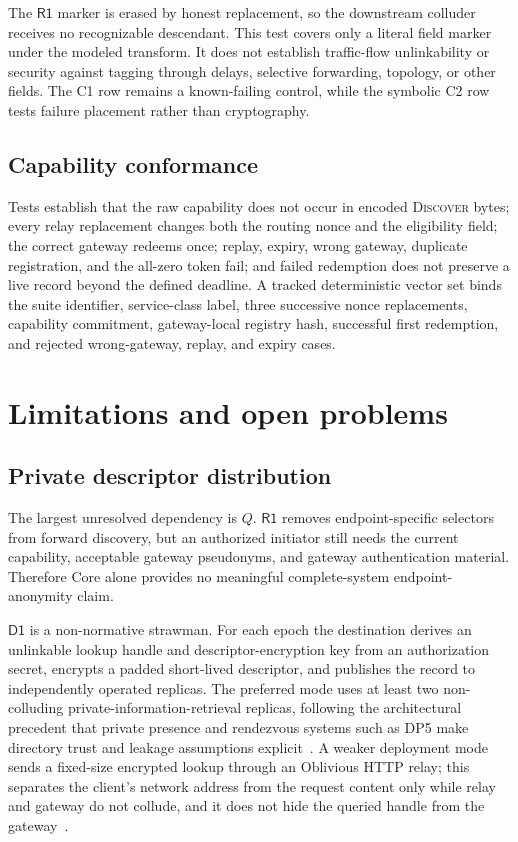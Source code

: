 \documentclass[11pt,oneside]{article}
\newcommand{\Rone}{\ensuremath{\mathsf{R1}}}
\newcommand{\Done}{\ensuremath{\mathsf{D1}}}
\begin{document}
The \Rone{} marker is erased by honest replacement, so the downstream colluder receives no recognizable descendant. This test covers only a literal field marker under the modeled transform. It does not establish traffic-flow unlinkability or security against tagging through delays, selective forwarding, topology, or other fields. The C1 row remains a known-failing control, while the symbolic C2 row tests failure placement rather than cryptography.

\subsection{Capability conformance}

Tests establish that the raw capability does not occur in encoded \textsc{Discover} bytes; every relay replacement changes both the routing nonce and the eligibility field; the correct gateway redeems once; replay, expiry, wrong gateway, duplicate registration, and the all-zero token fail; and failed redemption does not preserve a live record beyond the defined deadline. A tracked deterministic vector set binds the suite identifier, service-class label, three successive nonce replacements, capability commitment, gateway-local registry hash, successful first redemption, and rejected wrong-gateway, replay, and expiry cases.

\section{Limitations and open problems}
\label{sec:limitations}

\subsection{Private descriptor distribution}

The largest unresolved dependency is $Q$. \Rone{} removes endpoint-specific selectors from forward discovery, but an authorized initiator still needs the current capability, acceptable gateway pseudonyms, and gateway authentication material. Therefore Core alone provides no meaningful complete-system endpoint-anonymity claim.

\Done{} is a non-normative strawman. For each epoch the destination derives an unlinkable lookup handle and descriptor-encryption key from an authorization secret, encrypts a padded short-lived descriptor, and publishes the record to independently operated replicas. The preferred mode uses at least two non-colluding private-information-retrieval replicas, following the architectural precedent that private presence and rendezvous systems such as DP5 make directory trust and leakage assumptions explicit~\cite{dp5}. A weaker deployment mode sends a fixed-size encrypted lookup through an Oblivious HTTP relay; this separates the client's network address from the request content only while relay and gateway do not collude, and it does not hide the queried handle from the gateway~\cite{ohttp}.
\end{document}
